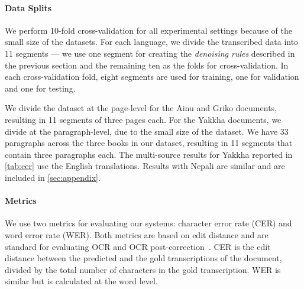 \paragraph{Data Splits}
We perform 10-fold cross-validation for all experimental settings because of the small size of the datasets. For each language, we divide the transcribed data into 11 segments --- we use one segment for creating the \emph{denoising rules} described in the previous section and the remaining ten as the folds for cross-validation. In each cross-validation fold, eight segments are used for training, one for validation and one for testing.

We divide the dataset at the page-level for the Ainu and Griko documents, resulting in 11 segments of three pages each. For the Yakkha documents, we divide at the paragraph-level, due to the small size of the dataset. We have 33 paragraphs across the three books in our dataset, resulting in 11 segments that contain three paragraphs each. The multi-source results for Yakkha reported in \autoref{tab:cer} use the English translations. Results with Nepali are similar and are included in \autoref{sec:appendix}.

\paragraph{Metrics}
We use two metrics for evaluating our systems: character error rate (CER) and word error rate (WER). Both metrics are based on edit distance and are standard for evaluating OCR and OCR post-correction~\cite{berg-kirkpatrick-etal-2013-unsupervised,schulz-kuhn-2017-multi}. 
CER is the edit distance between the predicted and the gold transcriptions of the document, divided by the total number of characters in the gold transcription. WER is similar but is calculated at the word level.

